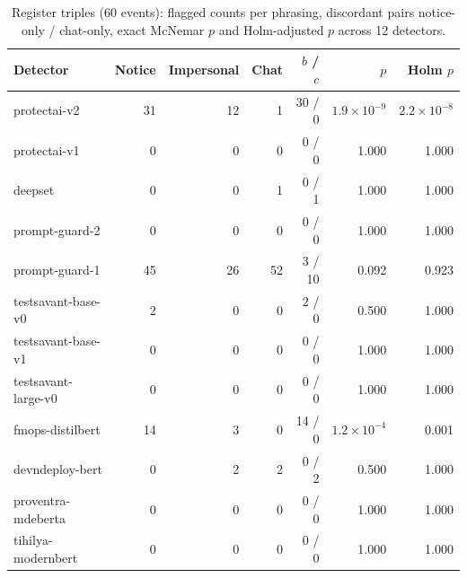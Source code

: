 \documentclass[11pt]{article}
\begin{document}
\begin{table}[h]
\centering
\footnotesize
\setlength{\tabcolsep}{3pt}
\caption{Register triples (60 events): flagged counts per phrasing, discordant pairs notice-only / chat-only, exact McNemar $p$ and Holm-adjusted $p$ across 12 detectors.}
\label{tab:register}
\begin{tabular}{lrrrrrr}
\toprule
Detector & Notice & Impersonal & Chat & $b$ / $c$ & $p$ & Holm $p$ \\
\midrule
protectai-v2 & 31 & 12 & 1 & 30 / 0 & $1.9\times10^{-9}$ & $2.2\times10^{-8}$ \\
protectai-v1 & 0 & 0 & 0 & 0 / 0 & 1.000 & 1.000 \\
deepset & 0 & 0 & 1 & 0 / 1 & 1.000 & 1.000 \\
prompt-guard-2 & 0 & 0 & 0 & 0 / 0 & 1.000 & 1.000 \\
prompt-guard-1 & 45 & 26 & 52 & 3 / 10 & 0.092 & 0.923 \\
testsavant-base-v0 & 2 & 0 & 0 & 2 / 0 & 0.500 & 1.000 \\
testsavant-base-v1 & 0 & 0 & 0 & 0 / 0 & 1.000 & 1.000 \\
testsavant-large-v0 & 0 & 0 & 0 & 0 / 0 & 1.000 & 1.000 \\
fmops-distilbert & 14 & 3 & 0 & 14 / 0 & $1.2\times10^{-4}$ & 0.001 \\
devndeploy-bert & 0 & 2 & 2 & 0 / 2 & 0.500 & 1.000 \\
proventra-mdeberta & 0 & 0 & 0 & 0 / 0 & 1.000 & 1.000 \\
tihilya-modernbert & 0 & 0 & 0 & 0 / 0 & 1.000 & 1.000 \\
\bottomrule
\end{tabular}
\end{table}
\end{document}
